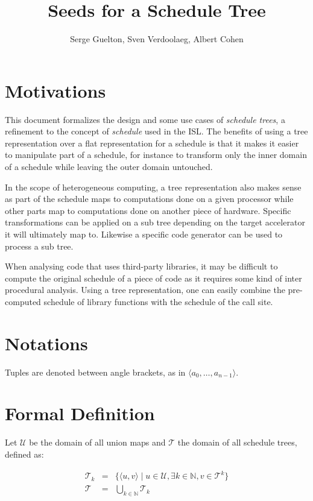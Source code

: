 \documentclass{article}
\title{Seeds for a Schedule Tree} %
\author{Serge Guelton, Sven Verdoolaeg, Albert Cohen}
\begin{document}
\maketitle

\section*{Motivations}

This document formalizes the design and some use cases of \emph{schedule
trees}, a refinement to the concept of \emph{schedule} used in the \ac{ISL}. The
benefits of using a tree representation over a flat representation for a
schedule is that it makes it easier to manipulate part of a schedule, for
instance to transform only the inner domain of a schedule while leaving the
outer domain untouched.

In the scope of heterogeneous computing, a tree representation also makes sense
as part of the schedule maps to computations done on a given processor while
other parts map to computations done on another piece of hardware. Specific
transformations can be applied on a sub tree depending on the target
accelerator it will ultimately map to. Likewise a specific code generator can
be used to process a sub tree.

When analysing code that uses third-party libraries, it may be difficult to
compute the original schedule of a piece of code as it requires some kind of
inter procedural analysis. Using a tree representation, one can easily combine
the pre-computed schedule of library functions with the schedule of the call
site.

\section*{Notations}

Tuples are denoted between angle brackets, as in $\langle a_0, \ldots, a_{n-1}\rangle$.

\section{Formal Definition}


Let $\mathcal{U}$ be the domain of all union maps and $\mathcal{T}$ the domain
of all schedule trees, defined as:

\[
    \begin{array}{lcl}
        \mathcal{T}_k &=& \{ \langle u, v\rangle \mid u \in \mathcal{U}, \exists k\in\mathbb{N}, v \in \mathcal{T}^k \} \\
        \mathcal{T} &=& \displaystyle\bigcup_{k\in\mathbb{N}} \mathcal{T}_k\\
    \end{array}
\]
\end{document}
